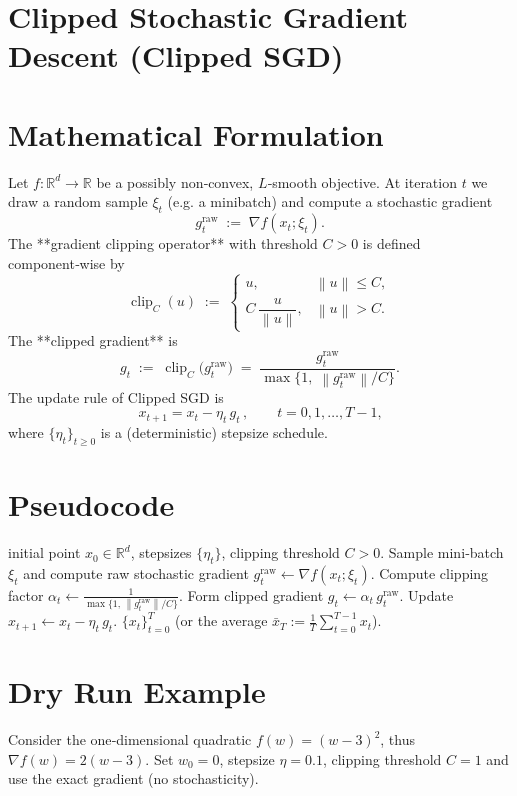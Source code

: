 \documentclass{article}
\newcommand{\norm}[1]{\left\lVert#1\right\rVert}
\newcommand{\clip}{\operatorname{clip}}
\begin{document}
\section*{Clipped Stochastic Gradient Descent (Clipped SGD)}

\section*{Mathematical Formulation}
Let $f:\mathbb{R}^{d}\rightarrow\mathbb{R}$ be a possibly non‑convex, $L$‑smooth objective.  
At iteration $t$ we draw a random sample $\xi_{t}$ (e.g. a minibatch) and compute a stochastic gradient
\[
g^{\text{raw}}_{t}\;:=\;\nabla f(x_{t};\xi_{t}) .
\]
The **gradient clipping operator** with threshold $C>0$ is defined component‑wise by
\[
\clip_{C}(u)\;:=\;
\begin{cases}
u, & \norm{u}\le C,\\[4pt]
C\,\dfrac{u}{\norm{u}}, & \norm{u}>C .
\end{cases}
\]
The **clipped gradient** is
\[
g_{t}\;:=\;\clip_{C}\!\bigl(g^{\text{raw}}_{t}\bigr)
          \;=\;\frac{g^{\text{raw}}_{t}}{\max\!\bigl\{1,\;\norm{g^{\text{raw}}_{t}}/C\bigr\}} .
\]
The update rule of Clipped SGD is
\[
\boxed{\,x_{t+1}=x_{t}-\eta_{t}\,g_{t}\,},\qquad t=0,1,\dots,T-1,
\]
where $\{\eta_{t}\}_{t\ge0}$ is a (deterministic) stepsize schedule.

\section*{Pseudocode}
\begin{algorithm}[H]
\caption{Clipped Stochastic Gradient Descent}
\begin{algorithmic}[1]
 initial point $x_{0}\in\mathbb{R}^{d}$, stepsizes $\{\eta_{t}\}$, clipping threshold $C>0$.
    \STATE Sample mini‑batch $\xi_{t}$ and compute raw stochastic gradient 
          $g^{\text{raw}}_{t}\gets \nabla f(x_{t};\xi_{t})$.
    \STATE Compute clipping factor 
          $\displaystyle \alpha_{t}\gets\frac{1}{\max\{1,\,\norm{g^{\text{raw}}_{t}}/C\}}$.
    \STATE Form clipped gradient $g_{t}\gets \alpha_{t}\,g^{\text{raw}}_{t}$.
    \STATE Update $x_{t+1}\gets x_{t}-\eta_{t}\,g_{t}$.
\ENDFOR
{} $\{x_{t}\}_{t=0}^{T}$ (or the average $\bar x_{T}:=\frac1T\sum_{t=0}^{T-1}x_{t}$).
\end{algorithmic}
\end{algorithm}

\section*{Dry Run Example}
Consider the one‑dimensional quadratic $f(w)=(w-3)^{2}$, thus $\nabla f(w)=2(w-3)$.  
Set $w_{0}=0$, stepsize $\eta=0.1$, clipping threshold $C=1$ and use the exact gradient (no stochasticity).
\end{document}
